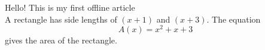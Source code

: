 \documentclass[12pt]{article}
\begin{document}
    Hello! This is my first offline article \\

    A rectangle has side lengths of $(x+1)$ and $(x+3)$.
    The equation $${A(x)=x^2+x+3}$$ gives the area of the rectangle.
\end{document}

